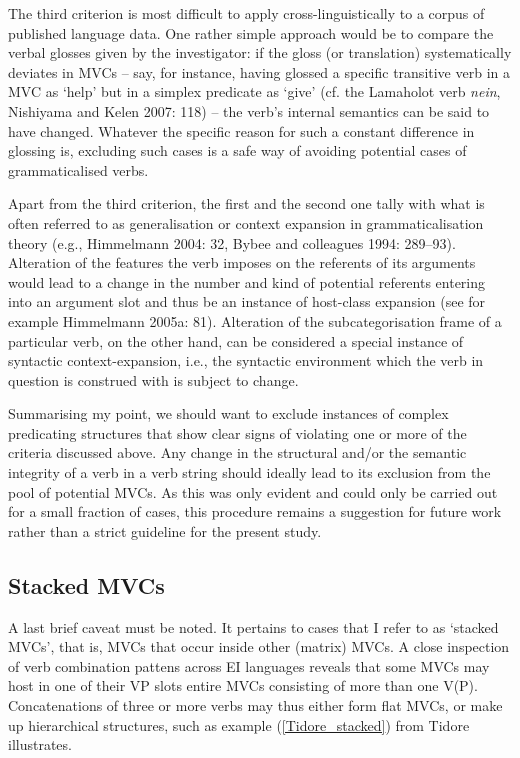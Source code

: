 The third criterion is most difficult to apply cross-linguistically to a corpus of published language data. One rather simple approach would be to compare the verbal glosses given by the investigator: if the gloss (or translation) systematically deviates in MVCs – say, for instance, having glossed a specific transitive verb in a MVC as `help’ but in a simplex predicate as `give’ (cf. the Lamaholot verb \textit{nein}, Nishiyama and Kelen 2007: 118) – the verb’s internal semantics can be said to have changed. Whatever the specific reason for such a constant difference in glossing is, excluding such cases is a safe way of avoiding potential cases of grammaticalised verbs.

Apart from the third criterion, the first and the second one tally with what is often referred to as generalisation or context expansion in grammaticalisation theory (e.g., Himmelmann 2004: 32, Bybee and colleagues 1994: 289--93). Alteration of the features the verb imposes on the referents of its arguments would lead to a change in the number and kind of potential referents entering into an argument slot and thus be an instance of host-class expansion (see for example Himmelmann 2005a: 81). Alteration of the subcategorisation frame of a particular verb, on the other hand, can be considered a special instance of syntactic context-expansion, i.e., the syntactic environment which the verb in question is construed with is subject to change. 

Summarising my point, we should want to exclude instances of complex predicating structures that show clear signs of violating one or more of the criteria discussed above. Any change in the structural and/or the semantic integrity of a verb in a verb string should ideally lead to its exclusion from the pool of potential MVCs. As this was only evident and could only be carried out for a small fraction of cases, this procedure remains a suggestion for future work rather than a strict guideline for the present study.

\subsection{Stacked MVCs}\label{sec:stackedmvcs}

A last brief caveat must be noted. It pertains to cases that I refer to as `stacked MVCs', that is, MVCs that occur inside other (matrix) MVCs. A close inspection of verb combination pattens across EI languages reveals that some MVCs may host in one of their VP slots entire MVCs consisting of more than one V(P). Concatenations of three or more verbs may thus either form flat MVCs, or make up hierarchical structures, such as example (\ref{Tidore_stacked}) from Tidore illustrates.


